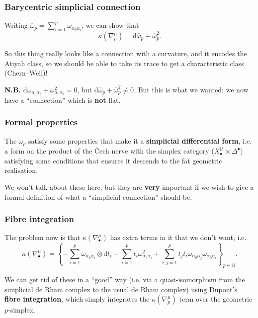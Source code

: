 \documentclass{beamer}
\begin{document}
  \begin{frame}\frametitle{Barycentric simplicial connection}
    Writing $\overline{\omega}_p = \sum_{i=1}^p \omega_{\alpha_0\alpha_i}$, we can show that
    \[
      \kappa(\nabla_p^\mu) = \mathrm{d}\overline{\omega}_p + \overline{\omega}_p^2.
    \]

    \pause

    So this thing really looks like a connection with a curvature, and it encodes the Atiyah class, so we should be able to take its trace to get a characteristic class (Chern--Weil)!

    \pause

    \textbf{N.B.} $\mathrm{d}\omega_{\alpha_0\alpha_i}+\omega_{\alpha_0\alpha_i}^2=0$, but $\mathrm{d}\overline{\omega}_p+\overline{\omega}_p^2\neq0$.
    But this is what we wanted: we now have a ``connection'' which is \textbf{not} flat.
  \end{frame}

  \begin{frame}\frametitle{Formal properties}
    The $\overline{\omega}_p$ satisfy some properties that make it a \textbf{simplicial differential form}, i.e. a form on the product of the Čech nerve with the simplex category ($X_\bullet^\mathscr{U}\times\Delta^\bullet$) satisfying some conditions that ensures it descends to the fat geometric realisation.

    \pause

    We won't talk about these here, but they are \textbf{very} important if we wish to give a formal definition of what a ``simplicial connection'' should be.
  \end{frame}

  \begin{frame}\frametitle{Fibre integration}
    The problem now is that $\kappa(\nabla_\bullet^\mu)$ has extra terms in it that we don't want, i.e.
    \[
      \kappa(\nabla_\bullet^\mu) =
      \left\{
        -\sum_{i=1}^p \omega_{\alpha_0\alpha_i}\otimes\mathrm{d}t_i
        -\sum_{i=1}^p t_i\omega_{\alpha_0\alpha_i}^2
        +\sum_{i,j=1}^p t_jt_i\omega_{\alpha_0\alpha_j}\omega_{\alpha_0\alpha_i}
      \right\}_{p\in\mathbb{N}}.
    \]

    \pause

    We can get rid of these in a ``good'' way (i.e. via a quasi-isomorphism from the simplicial de Rham complex to the usual de Rham complex) using Dupont's \textbf{fibre integration}, which simply integrates the $\kappa(\nabla_p^\mu)$ term over the geometric $p$-simplex.
  \end{frame}
\end{document}
